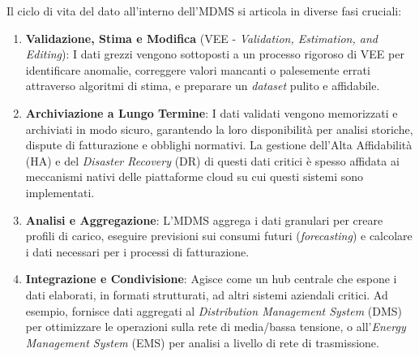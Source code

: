 Il ciclo di vita del dato all'interno dell'MDMS si articola in diverse fasi cruciali:


\begin{enumerate}
    \item \textbf{Validazione, Stima e Modifica} (VEE - \textit{Validation, Estimation, and Editing}): I dati grezzi vengono sottoposti a un processo rigoroso di VEE per identificare anomalie, correggere valori mancanti o palesemente errati attraverso algoritmi di stima, e preparare un \textit{dataset} pulito e affidabile.
    
    \item \textbf{Archiviazione a Lungo Termine}: I dati validati vengono memorizzati e archiviati in modo sicuro, garantendo la loro disponibilità per analisi storiche, dispute di fatturazione e obblighi normativi. La gestione dell'Alta Affidabilità (HA) e del \textit{Disaster Recovery} (DR) di questi dati critici è spesso affidata ai meccanismi nativi delle piattaforme cloud su cui questi sistemi sono implementati.
    
    \item \textbf{Analisi e Aggregazione}: L'MDMS aggrega i dati granulari per creare profili di carico, eseguire previsioni sui consumi futuri (\textit{forecasting}) e calcolare i dati necessari per i processi di fatturazione.
    
    \item \textbf{Integrazione e Condivisione}: Agisce come un hub centrale che espone i dati elaborati, in formati strutturati, ad altri sistemi aziendali critici. Ad esempio, fornisce dati aggregati al \textit{Distribution Management System} (DMS) per ottimizzare le operazioni sulla rete di media/bassa tensione, o all'\textit{Energy Management System} (EMS) per analisi a livello di rete di trasmissione.
\end{enumerate}


